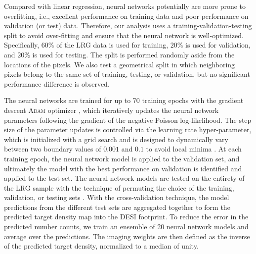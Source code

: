 Compared with linear regression, neural networks potentially are more prone to overfitting, i.e., excellent performance on training data and poor performance on validation (or test) data. Therefore, our analysis uses a training-validation-testing split to avoid over-fitting and ensure that the neural network is well-optimized. Specifically, $60\%$ of the LRG data is used for training, $20\%$ is used for validation, and $20\%$ is used for testing. The split is performed randomly aside from the locations of the pixels. We also test a geometrical split in which neighboring pixels belong to the same set of training, testing, or validation, but no significant performance difference is observed.

The neural networks are trained for up to 70 training epochs with the gradient descent \textsc{Adam} optimizer \citep{2017arXiv171105101L}, which iteratively updates the neural network parameters following the gradient of the negative Poisson log-likelihood. The step size of the parameter updates is controlled via the learning rate hyper-parameter, which is initialized with a grid search and is designed to dynamically vary between two boundary values of $0.001$ and $0.1$ to avoid local minima \citep[see again,][]{2016arXiv160803983L}. At each training epoch, the neural network model is applied to the validation set, and ultimately the model with the best performance on validation is identified and applied to the test set. The neural network models are tested on the entirety of the LRG sample with the technique of permuting the choice of the training, validation, or testing sets \citep{arlot2010survey}. With the cross-validation technique, the model predictions from the different test sets are aggregated together to form the predicted target density map into the DESI footprint. To reduce the error in the predicted number counts, we train an ensemble of 20 neural network models and average over the predictions. The imaging weights are then defined as the inverse of the predicted target density, normalized to a median of unity.

